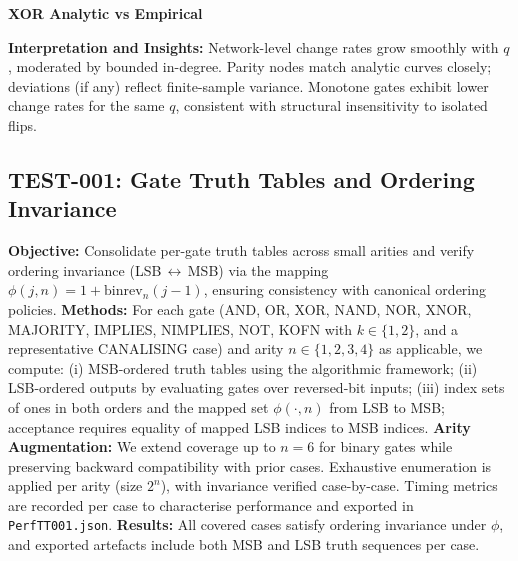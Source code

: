 \textbf{XOR Analytic vs Empirical}

\textbf{Interpretation and Insights:} Network-level change rates grow smoothly with \(q\), moderated by bounded in-degree. Parity nodes match analytic curves closely; deviations (if any) reflect finite-sample variance. Monotone gates exhibit lower change rates for the same \(q\), consistent with structural insensitivity to isolated flips.


\subsection{TEST-001: Gate Truth Tables and Ordering Invariance}
\textbf{Objective:} Consolidate per-gate truth tables across small arities and verify ordering invariance (LSB\,$\leftrightarrow$\,MSB) via the mapping $\phi(j,n)=1+\mathrm{binrev}_n(j-1)$, ensuring consistency with canonical ordering policies.
\textbf{Methods:} For each gate (AND, OR, XOR, NAND, NOR, XNOR, MAJORITY, IMPLIES, NIMPLIES, NOT, KOFN with $k\in\{1,2\}$, and a representative CANALISING case) and arity $n\in\{1,2,3,4\}$ as applicable, we compute:
(i) MSB-ordered truth tables using the algorithmic framework; (ii) LSB-ordered outputs by evaluating gates over reversed-bit inputs; (iii) index sets of ones in both orders and the mapped set $\phi(\cdot,n)$ from LSB to MSB; acceptance requires equality of mapped LSB indices to MSB indices.
\textbf{Arity Augmentation:} We extend coverage up to $n=6$ for binary gates while preserving backward compatibility with prior cases. Exhaustive enumeration is applied per arity (size $2^n$), with invariance verified case-by-case. Timing metrics are recorded per case to characterise performance and exported in \texttt{PerfTT001.json}.
\textbf{Results:} All covered cases satisfy ordering invariance under $\phi$, and exported artefacts include both MSB and LSB truth sequences per case.
